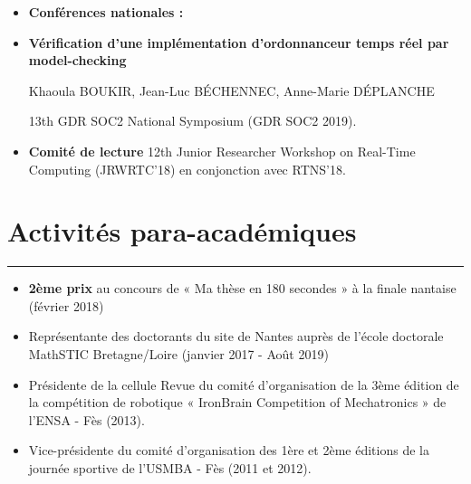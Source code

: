 \begin{itemize}
	\item \textbf{{\Large Conférences nationales : }}	
	
	
\end{itemize}

\begin{minipage}{0.08\textwidth}
	\hspace{0.1cm}
\end{minipage}
\begin{minipage}{0.9\textwidth}
\begin{itemize}[label=	\cite{boukir2019}]
	\item	\textbf{Vérification d’une implémentation d’ordonnanceur temps réel par	model-checking}
	
	Khaoula BOUKIR, Jean-Luc B\'{E}CHENNEC, Anne-Marie D\'{E}PLANCHE
	
	13th GDR SOC2 National Symposium (GDR SOC2 2019).
\end{itemize}
\end{minipage}

\begin{itemize}
	\item \textbf{{\Large Comité de lecture }} 12th Junior Researcher Workshop on Real-Time Computing (JRWRTC'18) en conjonction avec RTNS'18.
\end{itemize}



\section{Activités para-académiques}
\vspace{-0.6cm}
\hspace{0.7cm}\textcolor{myblue}{\rule{15cm}{1mm}}

\vspace{0.3cm}

\begin{itemize}
	\item \textbf{2ème prix} au concours de « Ma thèse en 180 secondes » à la finale nantaise (février 2018)
	
	\item Représentante des doctorants du site de Nantes auprès de l'école doctorale MathSTIC Bretagne/Loire (janvier 2017 - Août 2019)
	
	\item Présidente de la cellule Revue du comité d’organisation de la 3ème édition de la compétition de
	robotique « IronBrain Competition of Mechatronics » de l’ENSA - Fès (2013).
	
	\item Vice-présidente du comité d’organisation des 1ère et 2ème éditions de la journée sportive de
	l’USMBA - Fès (2011 et 2012).
	
\end{itemize}


